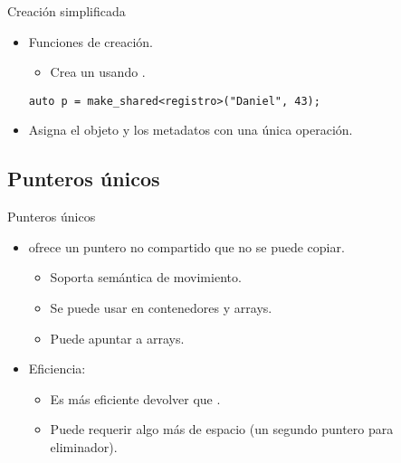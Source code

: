 \begin{frame}[t,fragile]{Creación simplificada}
\begin{itemize}
  \item Funciones de creación.
    \begin{itemize}
      \item {} Crea un  usando .
    \end{itemize}
\begin{lstlisting}
auto p = make_shared<registro>("Daniel", 43);
\end{lstlisting}
  \item Asigna el objeto y los metadatos con una única operación.
\end{itemize}
\end{frame}

\subsection{Punteros únicos}

\begin{frame}{Punteros únicos}
\begin{itemize}
  \item {} ofrece un puntero no compartido que no se puede copiar.
    \begin{itemize}
      \item Soporta semántica de movimiento.
      \item Se puede usar en contenedores y arrays.
      \item Puede apuntar a arrays.
    \end{itemize}
  \item Eficiencia:
    \begin{itemize}
      \item Es más eficiente devolver  que .
      \item Puede requerir algo más de espacio (un segundo puntero para eliminador).
    \end{itemize}
\end{itemize}
\end{frame}

